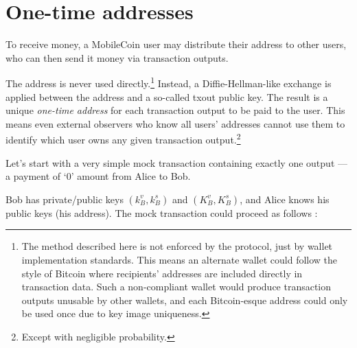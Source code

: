 \section{One-time addresses}
\label{sec:one-time-addresses}

To receive money, a MobileCoin user may distribute their address to other users, who can then send it money via transaction outputs.

The address is never used directly.\footnote{\label{footnote:address-wallet-standards}The method described here is not enforced by the protocol, just by wallet implementation standards. This means an alternate wallet could follow the style of Bitcoin where recipients' addresses are included directly in transaction data. Such a non-compliant wallet would produce transaction outputs unusable by other wallets, and each Bitcoin-esque address could only be used once due to key image uniqueness.} Instead, a Diffie-Hellman-like exchange is applied between the address and a so-called txout public key. The result is a unique {\em one-time address} for each transaction output to be paid to the user. This means even external observers who know all users’ addresses cannot use them to identify which user owns any given transaction output.\footnote{Except with negligible probability.}


Let’s start with a very simple mock transaction containing exactly one output --- a payment of `0' amount from Alice to Bob.

Bob has private/public keys $(k_B^v, k_B^s)$ and $(K_B^v, K_B^s)$, and Alice knows his public keys (his address). The mock transaction could proceed as follows \cite{cryptoNoteWhitePaper}:

